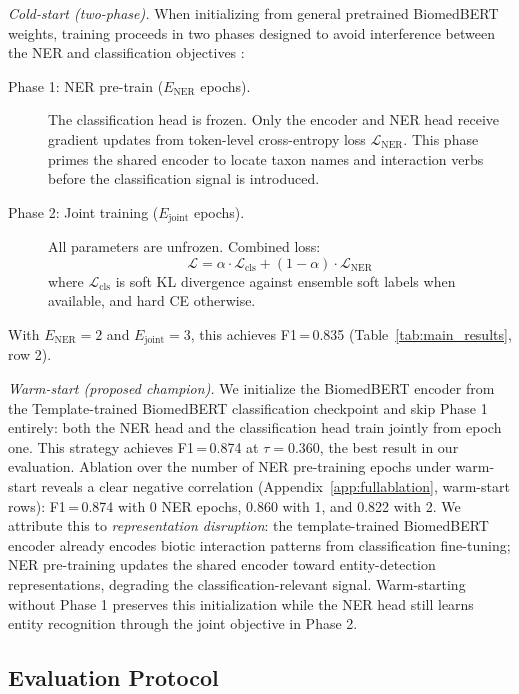 \documentclass[11pt,twocolumn]{article}
\begin{document}
\emph{Cold-start (two-phase).}
When initializing from general pretrained BiomedBERT weights, training
proceeds in two phases designed to avoid interference between the NER and
classification objectives \citep{liu2019multi}:
\begin{description}
    \item[Phase 1: NER pre-train ($E_\text{NER}$ epochs).]
    The classification head is frozen. Only the encoder and NER head receive
    gradient updates from token-level cross-entropy loss
    $\mathcal{L}_\text{NER}$.
    This phase primes the shared encoder to locate taxon names and
    interaction verbs before the classification signal is introduced.

    \item[Phase 2: Joint training ($E_\text{joint}$ epochs).]
    All parameters are unfrozen. Combined loss:
    \[
        \mathcal{L} = \alpha \cdot \mathcal{L}_\text{cls} +
                      (1{-}\alpha) \cdot \mathcal{L}_\text{NER}
    \]
    where $\mathcal{L}_\text{cls}$ is soft KL divergence against ensemble
    soft labels when available, and hard CE otherwise.
\end{description}
With $E_\text{NER}{=}2$ and $E_\text{joint}{=}3$, this achieves
F1\,=\,0.835 (Table~\ref{tab:main_results}, row 2).

\emph{Warm-start (proposed champion).}
We initialize the BiomedBERT encoder from the Template-trained
BiomedBERT classification checkpoint and skip Phase 1 entirely: both the NER head and
the classification head train jointly from epoch one.
This strategy achieves F1\,=\,0.874 at $\tau{=}0.360$, the best result in our evaluation.
Ablation over the number of NER pre-training epochs under warm-start
reveals a clear negative correlation (Appendix~\ref{app:fullablation},
warm-start rows): F1\,=\,0.874 with 0 NER epochs, 0.860 with 1, and
0.822 with 2.
We attribute this to \emph{representation disruption}: the template-trained
BiomedBERT encoder already encodes biotic interaction patterns from classification
fine-tuning; NER pre-training updates the shared encoder toward
entity-detection representations, degrading the classification-relevant
signal. Warm-starting without Phase 1 preserves this initialization
while the NER head still learns entity recognition through the joint
objective in Phase 2.

\subsection{Evaluation Protocol}
\label{sec:eval}
\end{document}
